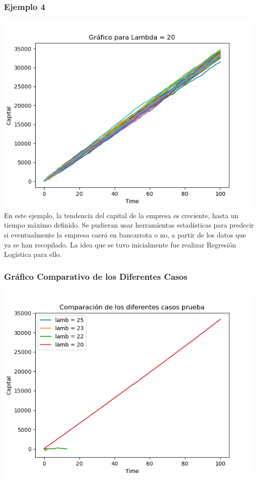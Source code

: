\documentclass{article}
\begin{document}
 \subsubsection{Ejemplo 4}
 \includegraphics[scale = 0.8]{lamb4.png}
 En este ejemplo, la tendencia del capital de la empresa es creciente, hasta un tiempo máximo definido. 
 Se pudieran usar herramientas estadísticas para predecir si eventualmente la empresa caerá en bancarrota o no, a partir de los datos que ya se han recopilado. La idea que se tuvo inicialmente fue realizar Regresión Logística para ello. 

 \subsubsection{Gráfico Comparativo de los Diferentes Casos}
 \includegraphics[scale = 0.8]{lambcompare.png}
\end{document}
